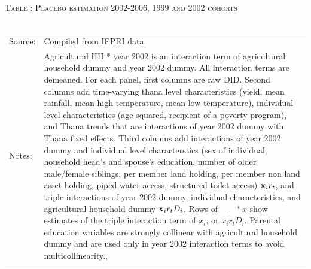 \documentclass[12pt,letterpaper]{article}
\newcommand{\bfx}{\ensuremath{\mbox{\bf x}}}
\newcommand{\0}{\ensuremath{\mbox{\boldmath $0$}}}
\begin{document}
{\begin{table}\hfil\textsc{\footnotesize Table \thetable: Placebo estimation 2002-2006, 1999 and 2002 cohorts\label{zEm.1999.10.sameN}}\\\setlength{\tabcolsep}{.5pt}\renewcommand{\arraystretch}{.675}\hspace{-2em}\hfil\\\renewcommand{\arraystretch}{1}\hfil\begin{tabular}{>{\hfill\scriptsize}p{1cm}<{}>{\scriptsize}p{12cm}<{\hfill}} Source:& Compiled from IFPRI data. \\[-1ex] Notes:&   \textsf{Agricultural HH * year 2002} is an interaction term of agricultural household dummy and year 2002 dummy. All interaction terms are demeaned. For each panel, first columns are raw DID. Second columns add time-varying thana level characteristics (yield, mean rainfall, mean high temperature, mean low temperature), individual level characteristics (age squared, recipient of a poverty program), and \textsf{Thana trends} that are interactions of year 2002 dummy with Thana fixed effects. Third columns add interactions of year 2002 dummy and individual level characterstics (sex of individual, household head's and spouse's education, number of older male/female siblings, per member land holding, per member non land asset holding, piped water access, structured toilet access) $\bfx_{i}r_{t}$, and triple interactions of year 2002 dummy, individual characteristics, and agricultural household dummy $\bfx_{i}r_{t}D_{i}$. Rows of $\underline{\phantom{mm}}*x$ show estimates of the triple interaction term of $x_{i}$, or $x_{i}r_{t}D_{i}$. Parental education variables are strongly collinear with agricultural household dummy and are used only in year 2002 interaction terms to avoid multicollinearity., \\   \end{tabular} \end{table}





}
\end{document}
